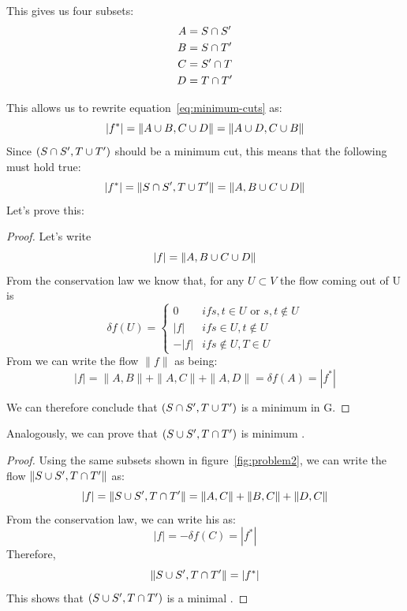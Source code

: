 This gives us four subsets:
\begin{align}
A &= S \cap S' \\
B &= S \cap T' \\
C &= S' \cap T \\
D &= T \cap T' 
\end{align}

This allows us to rewrite equation~\ref{eq:minimum-cuts} as:
\begin{equation}
|f^{*}| = \| A \cup B,  C \cup D \| = \| A \cup D, C \cup B \|
\label{eq:breaking-the-flow}
\end{equation}
Since $(S \cap S', T \cup T')$ should be a minimum cut, this means that the following must hold true:
\begin{equation}
|f^{*}| = \| S \cap S', T \cup T' \| = \| A, B \cup C \cup D \|
\label{eq:breaking-the-flow-intersect}
\end{equation}
Let's prove this:
\begin{proof}

Let's write
\begin{equation}
|f| = \|A, B \cup C \cup D \|
\label{eq:def-flow}
\end{equation}
From the conservation law we know that, for any $U \subset V$ the flow coming out of U is
\begin{equation}
\delta f(U) = 
  \begin{cases}
    0 & if {s,t} \in U \text{ or } {s,t} \notin U\\
    |f| & if s \in U, t \notin U \\
    -|f| & if s \notin U, T \in U
  \end{cases}
\end{equation}
From  we can write the flow $\|f\|$ as being:
\begin{equation}
|f| = \|A, B\| + \|A, C\| + \|A, D\| = \delta f(A) = |f^{*}|
\end{equation}

We can therefore conclude that $(S \cap S', T \cup T')$ is a minimum \stcut{} in G.
\end{proof}

Analogously, we can prove that $(S \cup S', T \cap T')$ is minimum \stcut{}.
\begin{proof}
Using the same subsets shown in figure~\ref{fig:problem2}, we can write the flow $\| S \cup S', T \cap T' \|$ as:
\begin{equation}
|f| = \| S \cup S', T \cap T' \| = \| A, C \| + \| B, C \| + \| D, C \|
\end{equation}
From the conservation law, we can write his as:
\begin{equation}
|f| = -\delta f(C) = |f^{*}|
\end{equation}
Therefore,
\begin{equation}
\| S \cup S', T \cap T' \| = |f^{*}|
\end{equation}
This shows that $(S \cup S', T \cap T')$ is a minimal \stcut{}.
\end{proof}
